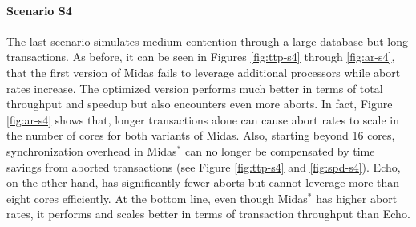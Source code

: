 \paragraph{Scenario S4}

The last scenario simulates medium contention through a large database but long
transactions. As before, it can be seen in Figures \ref{fig:ttp-s4} through
\ref{fig:ar-s4}, that the first version of Midas fails to leverage additional
processors while abort rates increase. The optimized version performs much
better in terms of total throughput and speedup but also encounters even more
aborts. In fact, Figure \ref{fig:ar-s4} shows that, longer transactions alone
can cause abort rates to scale in the number of cores for both variants of
Midas. Also, starting beyond 16 cores, synchronization overhead in Midas$^{*}$
can no longer be compensated by time savings from aborted transactions (see
Figure \ref{fig:ttp-s4} and \ref{fig:spd-s4}). Echo, on the other hand, has
significantly fewer aborts but cannot leverage more than eight cores
efficiently. At the bottom line, even though Midas$^{*}$ has higher abort rates,
it performs and scales better in terms of transaction throughput than Echo.

